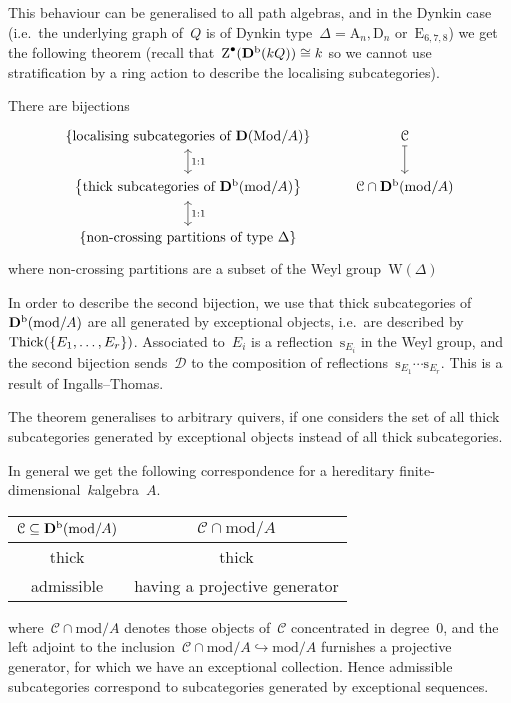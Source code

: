 \documentclass[10pt,a4paper]{article}
\begin{document}
This behaviour can be generalised to all path algebras, and in the Dynkin case (i.e.\ the underlying graph of~$Q$ is of Dynkin type~$\Delta=\mathrm{A}_n,\mathrm{D}_n$ or~$\mathrm{E}_{6,7,8}$) we get the following theorem (recall that~$\operatorname{Z}^\bullet(\mathbf{D}^{\mathrm{b}}(kQ))\cong k$ so we cannot use stratification by a ring action to describe the localising subcategories).
\begin{theorem}
  There are bijections
  \begin{equation}
    \begin{tikzcd}
      \left\{ \text{localising subcategories of $\derived(\Mod/A)$} \right\} \arrow[leftrightarrow]{d}{1:1} & \mathcal{C} \arrow[mapsto]{d} \\
      \left\{ \text{thick subcategories of $\derived^\bounded(\mathrm{mod}/A)$} \right\} \arrow[leftrightarrow]{d}{1:1} & \mathcal{C}\cap\derived^\bounded(\mathrm{mod}/A) \\
      \left\{ \text{non-crossing partitions of type~$\Delta$} \right\}
    \end{tikzcd}
  \end{equation}
  where non-crossing partitions are a subset of the Weyl group~$\mathrm{W}(\Delta)$
\end{theorem}

In order to describe the second bijection, we use that thick subcategories of~$\mathbf{D}^{\mathrm{b}}(\mathrm{mod}/A)$ are all generated by exceptional objects, i.e.\ are described by~$\operatorname{Thick}(\{E_1,\dotsc,E_r\})$. Associated to~$E_i$ is a reflection~$\mathrm{s}_{E_i}$ in the Weyl group, and the second bijection sends~$\mathcal{D}$ to the composition of reflections~$\mathrm{s}_{E_1}\dotsm\mathrm{s}_{E_r}$. This is a result of Ingalls--Thomas.

\begin{remark}
  The theorem generalises to arbitrary quivers, if one considers the set of all thick subcategories generated by exceptional objects instead of all thick subcategories.

  In general we get the following correspondence for a hereditary finite-dimensional~$k$\dash algebra~$A$.

  \begin{center}
    \begin{tabular}{cc}
      \toprule
      $\mathcal{C}\subseteq\mathbf{D}^{\mathrm{b}}(\mathrm{mod}/A)$ & $\mathcal{C}\cap\mathrm{mod}/A$ \\\midrule
      thick & thick \\
      admissible & having a projective generator \\
      \bottomrule
    \end{tabular}
  \end{center}

  where~$\mathcal{C}\cap\mathrm{mod}/A$ denotes those objects of~$\mathcal{C}$ concentrated in degree~0, and the left adjoint to the inclusion~$\mathcal{C}\cap\mathrm{mod}/A\hookrightarrow\mathrm{mod}/A$ furnishes a projective generator, for which we have an exceptional collection. Hence admissible subcategories correspond to subcategories generated by exceptional sequences.
\end{remark}
\end{document}
